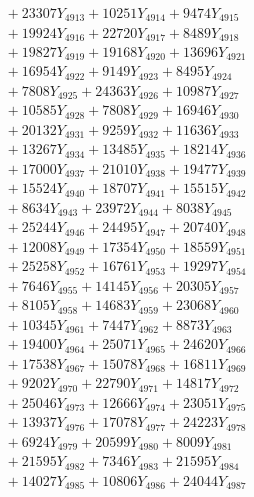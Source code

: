 \documentclass[a4paper,10pt]{article}
\begin{document}
{\begin{align}
&\;  + 23307 Y_{4913} + 10251 Y_{4914} + 9474 Y_{4915} \\[0.3ex]
&\;  + 19924 Y_{4916} + 22720 Y_{4917} + 8489 Y_{4918} \\[0.5ex]\allowbreak
&\;  + 19827 Y_{4919} + 19168 Y_{4920} + 13696 Y_{4921} \\[0.3ex]
&\;  + 16954 Y_{4922} + 9149 Y_{4923} + 8495 Y_{4924} \\[0.3ex]
&\;  + 7808 Y_{4925} + 24363 Y_{4926} + 10987 Y_{4927} \\[0.3ex]
&\;  + 10585 Y_{4928} + 7808 Y_{4929} + 16946 Y_{4930} \\[0.3ex]
&\;  + 20132 Y_{4931} + 9259 Y_{4932} + 11636 Y_{4933} \\[0.3ex]
&\;  + 13267 Y_{4934} + 13485 Y_{4935} + 18214 Y_{4936} \\[0.3ex]
&\;  + 17000 Y_{4937} + 21010 Y_{4938} + 19477 Y_{4939} \\[0.3ex]
&\;  + 15524 Y_{4940} + 18707 Y_{4941} + 15515 Y_{4942} \\[0.3ex]
&\;  + 8634 Y_{4943} + 23972 Y_{4944} + 8038 Y_{4945} \\[0.3ex]
&\;  + 25244 Y_{4946} + 24495 Y_{4947} + 20740 Y_{4948} \\[0.5ex]\allowbreak
&\;  + 12008 Y_{4949} + 17354 Y_{4950} + 18559 Y_{4951} \\[0.3ex]
&\;  + 25258 Y_{4952} + 16761 Y_{4953} + 19297 Y_{4954} \\[0.3ex]
&\;  + 7646 Y_{4955} + 14145 Y_{4956} + 20305 Y_{4957} \\[0.3ex]
&\;  + 8105 Y_{4958} + 14683 Y_{4959} + 23068 Y_{4960} \\[0.3ex]
&\;  + 10345 Y_{4961} + 7447 Y_{4962} + 8873 Y_{4963} \\[0.3ex]
&\;  + 19400 Y_{4964} + 25071 Y_{4965} + 24620 Y_{4966} \\[0.3ex]
&\;  + 17538 Y_{4967} + 15078 Y_{4968} + 16811 Y_{4969} \\[0.3ex]
&\;  + 9202 Y_{4970} + 22790 Y_{4971} + 14817 Y_{4972} \\[0.3ex]
&\;  + 25046 Y_{4973} + 12666 Y_{4974} + 23051 Y_{4975} \\[0.3ex]
&\;  + 13937 Y_{4976} + 17078 Y_{4977} + 24223 Y_{4978} \\[0.5ex]\allowbreak
&\;  + 6924 Y_{4979} + 20599 Y_{4980} + 8009 Y_{4981} \\[0.3ex]
&\;  + 21595 Y_{4982} + 7346 Y_{4983} + 21595 Y_{4984} \\[0.3ex]
&\;  + 14027 Y_{4985} + 10806 Y_{4986} + 24044 Y_{4987} \\[0.3ex]

\end{align}}
\end{document}
